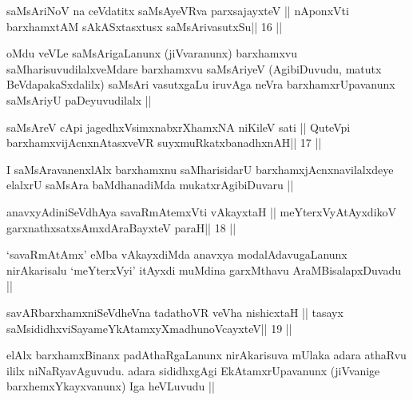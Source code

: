 \begin{shl}
saMsAriNoV na ceVdatitx saMsAyeVRva parxsajayxteV ||
nA\s ponxVti barxhamxtAM sAkASxtasxtusx saMsArivasutxSu\hfill || 16 ||
\end{shl}

\begin{artha}
oMdu veVLe saMsArigaLanunx (jiVvaranunx) barxhamxvu
saMharisuvudilalxveMdare barxhamxvu saMsAriyeV (AgibiDuvudu, matutx
BeVdapakaSxdalilx) saMsAri vasutxgaLu iruvAga neVra barxhamxrUpavanunx
saMsAriyU paDeyuvudilalx ||
\end{artha}

\begin{shl}
saMsAreV cApi jagedhxV\s simxnabxrXhamxNA niKileV sati ||
QuteV\s pi barxhamxvijAcnxnAtasxveVR suyxmuRkatxbanadhxnAH\hfill || 17 ||
\end{shl}

\begin{artha}
I saMsAravanenxlAlx barxhamxnu saMharisidarU barxhamxjAcnxnavilalxdeye
elalxrU saMsAra baMdhanadiMda mukatxrAgibiDuvaru ||
\end{artha}


\begin{shl}
anavxyAdiniSeVdhAya savaRmAtemxVti vAkayxtaH ||
meYterxVyAtAyxdikoV garxnathxsatxsAmxdAraBayxteV paraH\hfill || 18 ||
\end{shl}

\begin{artha}
`savaRmAtAmx' eMba vAkayxdiMda anavxya modalAdavugaLanunx
  nirAkarisalu `meYterxVyi' itAyxdi muMdina garxMthavu
  AraMBisalapxDuvadu ||
\end{artha}


\begin{shl}
savARbarxhamxniSeVdheVna tadathoVR veVha nishicxtaH ||
tasayx saMsididhxviSayameYkAtamxyXmadhunoVcayxteV\hfill || 19 ||
\end{shl}

\begin{artha}
elAlx barxhamxBinanx padAthaRgaLanunx nirAkarisuva mUlaka adara
athaRvu ililx niNaRyavAguvudu. adara sididhxgAgi EkAtamxrUpavanunx
(jiVvanige barxhemxYkayxvanunx) Iga heVLuvudu ||
\end{artha}



